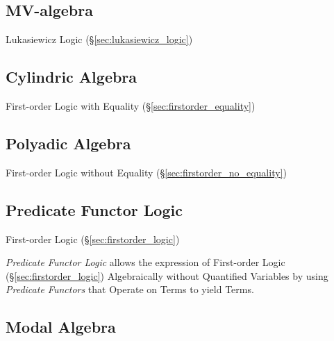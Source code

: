 \subsection{MV-algebra}\label{sec:mv_algebra}

Lukasiewicz Logic (\S\ref{sec:lukasiewicz_logic})



\subsection{Cylindric Algebra}\label{sec:cylindric_algebra}

First-order Logic with Equality (\S\ref{sec:firstorder_equality})



\subsection{Polyadic Algebra}\label{sec:polyadic_algebra}

First-order Logic without Equality
(\S\ref{sec:firstorder_no_equality})



\subsection{Predicate Functor Logic}\label{sec:pfl}

First-order Logic (\S\ref{sec:firstorder_logic})

\emph{Predicate Functor Logic} allows the expression of First-order
Logic (\S\ref{sec:firstorder_logic}) Algebraically without Quantified
Variables by using \emph{Predicate Functors} that Operate on Terms to
yield Terms.



\subsection{Modal Algebra}\label{sec:modal_algebra}

